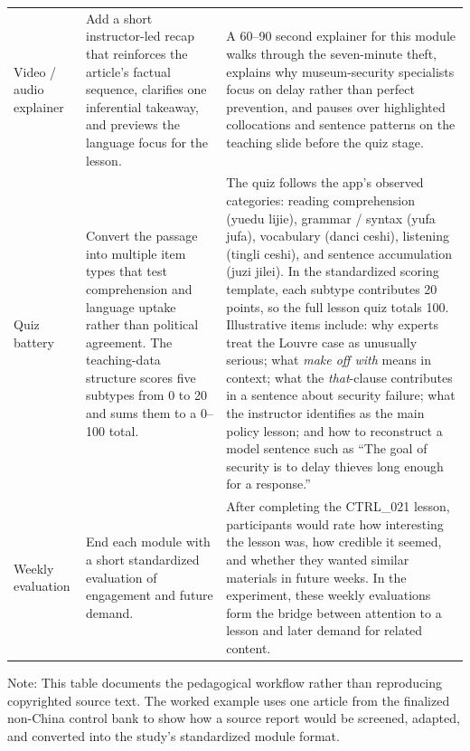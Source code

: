 \begin{table}[H]
\begin{threeparttable}
\begin{tabularx}{\textwidth}{p{1.9cm}p{4.0cm}X}
\addlinespace
Video / audio explainer & Add a short instructor-led recap that reinforces the article's factual sequence, clarifies one inferential takeaway, and previews the language focus for the lesson. & A 60--90 second explainer for this module walks through the seven-minute theft, explains why museum-security specialists focus on delay rather than perfect prevention, and pauses over highlighted collocations and sentence patterns on the teaching slide before the quiz stage. \\
\addlinespace
Quiz battery & Convert the passage into multiple item types that test comprehension and language uptake rather than political agreement. The teaching-data structure scores five subtypes from 0 to 20 and sums them to a 0--100 total. & The quiz follows the app's observed categories: reading comprehension (yuedu lijie), grammar / syntax (yufa jufa), vocabulary (danci ceshi), listening (tingli ceshi), and sentence accumulation (juzi jilei). In the standardized scoring template, each subtype contributes 20 points, so the full lesson quiz totals 100. Illustrative items include: why experts treat the Louvre case as unusually serious; what \textit{make off with} means in context; what the \textit{that}-clause contributes in a sentence about security failure; what the instructor identifies as the main policy lesson; and how to reconstruct a model sentence such as ``The goal of security is to delay thieves long enough for a response.'' \\
\addlinespace
Weekly evaluation & End each module with a short standardized evaluation of engagement and future demand. & After completing the CTRL\_021 lesson, participants would rate how interesting the lesson was, how credible it seemed, and whether they wanted similar materials in future weeks. In the experiment, these weekly evaluations form the bridge between attention to a lesson and later demand for related content. \\
\bottomrule
\end{tabularx}
\begin{tablenotes}[flushleft]
\footnotesize
\item Note: This table documents the pedagogical workflow rather than reproducing copyrighted source text. The worked example uses one article from the finalized non-China control bank to show how a source report would be screened, adapted, and converted into the study's standardized module format.
\end{tablenotes}
\end{threeparttable}
\end{table}
